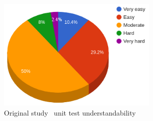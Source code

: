     \begin{figure}[ht]
      \begin{center}
        \includegraphics[width=7.7cm]{images/org-understandability.png}
        \caption{Original study~\cite{li2016automatically} unit test understandability}
        \label{fig:TDD}
      \end{center}
    \end{figure}

